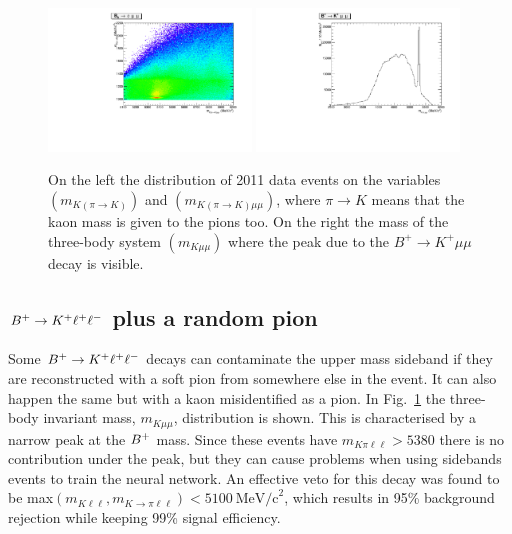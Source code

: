 \begin{center}
\begin{figure}[h!]
\label{fig:phiplots}
\centering 
\includegraphics[width=0.48\textwidth]{RKst/figs/RKst/phi.pdf}
\includegraphics[width=0.48\textwidth]{RKst/figs/RKst/Kmumu.pdf}
\caption{ On the left the distribution of 2011 data events on the variables $(m_{K(\pi\rightarrow K)})$ 
and $(m_{K(\pi\rightarrow K)\mu\mu})$, where $\pi\rightarrow K$ means that the kaon mass is given 
to the pions too. On the right the mass of the three-body system $(m_{K\mu\mu})$
where the peak due to the $B^+ \rightarrow K^+ \mu\mu$ decay is visible. }
\end{figure}
\end{center}


\subsection{${{B}^+} \rightarrow K^+ \ell^+\ell^-$ plus a random pion}

Some ${{B}^+} \rightarrow K^+ \ell^+\ell^-$ decays can contaminate the upper \Bz mass sideband if they are reconstructed
with a soft pion from somewhere else in the event. It can also happen the same but with a kaon
misidentified as a pion. In Fig.~\ref{fig:phiplots} the three-body invariant mass,
$m_{K\mu\mu}$, distribution is shown. This is characterised by a narrow peak at the ${{B}^+}$ mass. Since these
events have $m_{K\pi\ell\ell} > 5380$ \mevcc  there is no contribution under the \Bz peak,
but they can cause problems when using sidebands events to train the neural network.
An effective veto for this decay was found to be max$(m_{K\ell\ell},m_{K\to\pi\ell\ell}) < 5100 ~\mbox{MeV/c}^2$,
which results in 95\% background rejection while keeping 99\% signal efficiency.

